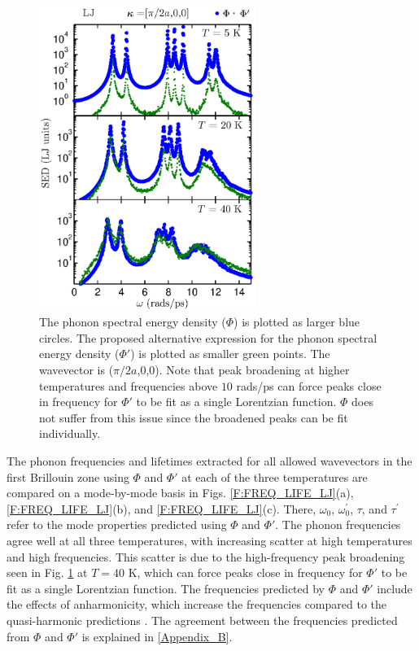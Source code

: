 \documentclass[12pt,twocolumn,iop]{/usr/share/texmf-texlive/tex/latex/iop/iopart}[/usr/share/texmf-texlive/tex/latex/iop/]
\begin{document}
\begin{figure}
\begin{center}
\includegraphics[angle=0,width=70.0mm]{figure2.eps}
\vspace*{0mm}
\end{center}
\caption{\label{F:PEAK_COMPARE} The phonon spectral energy density ($\Phi$) is plotted as larger blue circles.  The proposed alternative expression for the phonon spectral energy density ($\Phi'$) is plotted as smaller green points. The wavevector is ($\pi/2a$,0,0). Note that peak broadening at higher temperatures and frequencies above $10$ rads/ps can force peaks close in frequency for $\Phi'$ to be fit as a single Lorentzian function. $\Phi$ does not suffer from this issue since the broadened peaks can be fit individually.}
\end{figure}

The phonon frequencies and lifetimes extracted for all allowed wavevectors in the first Brillouin zone using $\Phi$ and $\Phi'$ at each of the three temperatures are compared on a mode-by-mode basis in Figs$.$ \ref{F:FREQ_LIFE_LJ}(a), \ref{F:FREQ_LIFE_LJ}(b), and \ref{F:FREQ_LIFE_LJ}(c). There, $\omega_0$, $\omega_0^{'}$, $\tau$, and $\tau^{'}$  refer to the mode properties predicted using $\Phi$ and $\Phi'$. The phonon frequencies agree well at all three temperatures, with increasing scatter at high temperatures and high frequencies.  This scatter is due to the high-frequency peak broadening seen in Fig$.$ \ref{F:PEAK_COMPARE} at $T = 40$ K, which can force peaks close in frequency for $\Phi'$ to be fit as a single Lorentzian function. The frequencies predicted by $\Phi$ and $\Phi'$ include the effects of anharmonicity, which increase the frequencies compared to the quasi-harmonic predictions \cite{mcgaughey2004c,turney2009a}. The agreement between the frequencies predicted from $\Phi$ and $\Phi'$ is explained in \ref{Appendix_B}.
\end{document}
